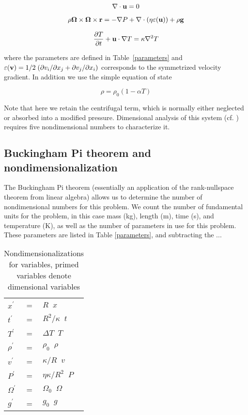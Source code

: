 \documentclass[extra]{gji}
\newif\ifdetail
\begin{document}
\begin{equation}
\nabla \cdot {\bf u} = 0
\label{conserve_mass}
\end{equation}

\begin{equation}
\begin{aligned}
 \rho{\bf \Omega \times \Omega \times r}= - \nabla P + \nabla \cdot \left( \eta \varepsilon ({\bf u}) \right) + \rho {\bf g}
\label{navier_stokes}
\end{aligned}
\end{equation}

\begin{equation}
\frac{\partial T}{\partial t} + {\bf u} \cdot \nabla T = \kappa \nabla^2 T
\label{energy}
\end{equation}

 where the parameters are defined in Table~\ref{parameters} and $\varepsilon({\bf v}) = 1/2 \; ( \partial v_i / \partial x_j + \partial v_j / \partial x_i )$ corresponds to the symmetrized velocity gradient.
 In addition we use the simple equation of state

\begin{equation}
\rho = \rho_0 \left( 1 - \alpha T \right)
\label{eos}
\end{equation}

Note that here we retain the centrifugal term, which is normally either neglected or absorbed into a modified pressure. 
Dimensional analysis of this system (cf. \citet{barenblatt1996scaling}) requires five nondimensional numbers to characterize it.

\ifdetail
\subsection{Buckingham Pi theorem and nondimensionalization}
The Buckingham Pi theorem (essentially an application of the rank-nullspace theorem from linear algebra) allows us to determine the number of nondimensional numbers for this problem.  
We count the number of fundamental units for the problem, in this case mass (kg), length (m), time (s), and temperature (K), as well as the number of parameters in use for this problem.  
These parameters are listed in Table \ref{parameters}, and subtracting the ...

\begin{table}
\caption{Nondimensionalizations for variables, primed variables denote dimensional variables}
\label{nondim_convert}
\begin{tabular}{@{}lll}
$x^\prime$ &=& $R \;\; x$ \\
$t^\prime$ &=& $R^2/\kappa \;\; t$ \\
$T^\prime$ &=& $\Delta T \;\; T$ \\
$\rho^\prime$ &=& $\rho_0 \;\; \rho$\\
$v^\prime$ &=& $\kappa/R \;\; v$ \\
$P^\prime$ &=& $\eta \kappa/R^2 \;\; P$ \\
$\Omega^\prime$ &=& $\Omega_0 \;\; \Omega$ \\
$g^\prime$ &=& $g_0 \;\; g$
\end{tabular}
\end{table}
\end{document}
